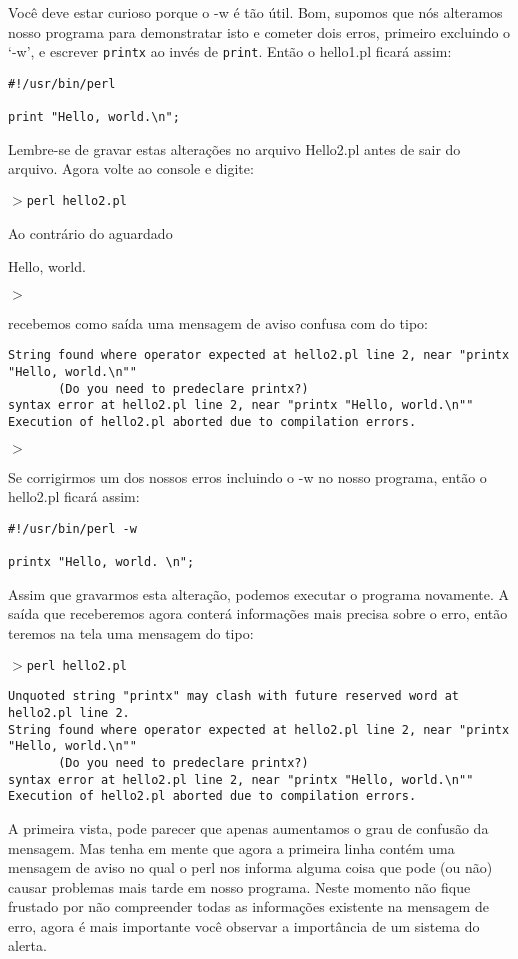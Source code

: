 \documentclass[a4paper,12pt,twoside]{book}
\begin{document}
\noindent Você deve estar curioso porque o -w é tão útil. Bom, supomos que nós 
alteramos nosso programa para demonstratar isto e cometer dois erros,
primeiro excluindo o `-w', e escrever \texttt{printx} ao invés de \texttt{print}. 
Então o hello1.pl ficará assim: 

\begin{lstlisting}
#!/usr/bin/perl

print "Hello, world.\n";
\end{lstlisting}


\noindent Lembre-se de gravar estas alterações no arquivo Hello2.pl antes
de sair do arquivo. Agora volte ao console e digite:\medskip

\noindent $>$\texttt{perl hello2.pl}\medskip

\noindent Ao contrário do aguardado\medskip

\noindent Hello, world.

\noindent $>$\medskip

\noindent recebemos como saída uma mensagem de aviso confusa com do tipo:
{\scriptsize
\begin{verbatim}
String found where operator expected at hello2.pl line 2, near "printx "Hello, world.\n""                                                                                                              
       (Do you need to predeclare printx?)
syntax error at hello2.pl line 2, near "printx "Hello, world.\n""
Execution of hello2.pl aborted due to compilation errors.
\end{verbatim}
}\noindent $>$\medskip

\noindent Se corrigirmos um dos nossos erros incluindo o -w no nosso programa, então o hello2.pl ficará assim:\medskip
\begin{lstlisting}
#!/usr/bin/perl -w

printx "Hello, world. \n";
\end{lstlisting}
\noindent Assim que gravarmos esta alteração, podemos executar o programa novamente. 
A saída que receberemos agora conterá informações mais precisa sobre o erro, 
então teremos na tela uma mensagem do tipo:\medskip

\noindent $>$\texttt{perl hello2.pl}\medskip
{\scriptsize
\begin{verbatim}
Unquoted string "printx" may clash with future reserved word at hello2.pl line 2.
String found where operator expected at hello2.pl line 2, near "printx "Hello, world.\n""
       (Do you need to predeclare printx?)
syntax error at hello2.pl line 2, near "printx "Hello, world.\n""
Execution of hello2.pl aborted due to compilation errors.
\end{verbatim}
}
\noindent A primeira vista, pode parecer que apenas aumentamos o grau de confusão 
da mensagem. Mas tenha em mente que agora a primeira linha contém uma mensagem de
aviso no qual o perl nos informa alguma coisa que pode (ou não) causar problemas 
mais tarde em nosso programa. Neste momento não fique frustado por não compreender 
todas as informações existente na mensagem de erro, agora é mais importante você 
observar a importância de um sistema do alerta.\medskip
\end{document}
